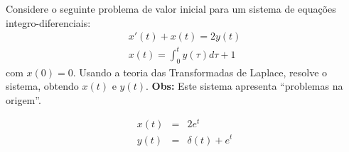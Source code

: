 \begin{Exercise} Considere o seguinte problema de valor inicial para um sistema de equações integro-diferenciais:
\begin{eqnarray*}
 x'(t) +x(t) = 2 y(t)\\
 x(t) = \int_0^t y(\tau) d\tau + 1
\end{eqnarray*}
com $x(0)=0$. Usando a teoria das Transformadas de Laplace, resolve o sistema, obtendo $x(t)$ e $y(t)$.
{\bf Obs:}  Este sistema apresenta ``problemas na origem''. 
\end{Exercise}
\begin{Answer}
 \begin{eqnarray}
  x(t)&=&2e^t  \\
  y(t)&=&\delta(t)+e^t
 \end{eqnarray}

\end{Answer}





%